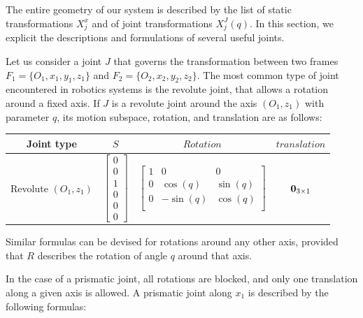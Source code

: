 
The entire geometry of our system is described by the list of static transformations $X^x_j$ and of joint transformations $X^J_j (q)$.
In this section, we explicit the descriptions and formulations of several useful joints.

Let us consider a joint $J$ that governs the transformation between two frames $F_1=\{O_1, x_1, y_1, z_1\}$ and $F_2=\{O_2, x_2, y_2, z_2\}$.
The most common type of joint encountered in robotics systems is the revolute joint, that allows a rotation around a fixed axis.
If $J$ is a revolute joint around the axis $(O_1,z_1)$ with parameter $q$, its motion subspace, rotation, and translation are as follows:

\begin{table} [ht]
\centering
\begin{tabular}{cccc}
  \toprule
  Joint type & $S$ & $Rotation$ & $translation$ \\
  \midrule
  Revolute $(O_1,z_1)$
  &
  $\begin{bmatrix}
    0 \\ 0 \\ 1 \\ 0 \\ 0 \\ 0
  \end{bmatrix}$
  &
  $\begin{bmatrix}
    1 & 0 & 0 \\
    0 & \cos (q) & \sin (q) \\
    0 & -\sin (q) & \cos (q) \\
  \end{bmatrix}$
  &
  ${\bf 0}_{3\times1}$
  \\
  \bottomrule
\end{tabular}
\end{table}

Similar formulas can be devised for rotations around any other axis, provided that $R$ describes the rotation of angle $q$ around that axis.

In the case of a prismatic joint, all rotations are blocked, and only one translation along a given axis is allowed.
A prismatic joint along $x_1$ is described by the following formulas:


